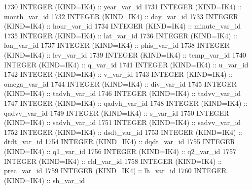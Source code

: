\begin{DoxyCode}
1730     \textcolor{keywordtype}{INTEGER (KIND=IK4)}                  :: year\_var\_id
1731     \textcolor{keywordtype}{INTEGER (KIND=IK4)}                  :: month\_var\_id
1732     \textcolor{keywordtype}{INTEGER (KIND=IK4)}                  :: day\_var\_id
1733     \textcolor{keywordtype}{INTEGER (KIND=IK4)}                  :: hour\_var\_id
1734     \textcolor{keywordtype}{INTEGER (KIND=IK4)}                  :: minute\_var\_id
1735     \textcolor{keywordtype}{INTEGER (KIND=IK4)}                  :: lat\_var\_id
1736     \textcolor{keywordtype}{INTEGER (KIND=IK4)}                  :: lon\_var\_id
1737     \textcolor{keywordtype}{INTEGER (KIND=IK4)}                  :: phis\_var\_id
1738     \textcolor{keywordtype}{INTEGER (KIND=IK4)}                  :: lev\_var\_id
1739     \textcolor{keywordtype}{INTEGER (KIND=IK4)}                  :: temp\_var\_id
1740     \textcolor{keywordtype}{INTEGER (KIND=IK4)}                  :: q\_var\_id
1741     \textcolor{keywordtype}{INTEGER (KIND=IK4)}                  :: u\_var\_id
1742     \textcolor{keywordtype}{INTEGER (KIND=IK4)}                  :: v\_var\_id
1743     \textcolor{keywordtype}{INTEGER (KIND=IK4)}                  :: omega\_var\_id
1744     \textcolor{keywordtype}{INTEGER (KIND=IK4)}                  :: div\_var\_id
1745     \textcolor{keywordtype}{INTEGER (KIND=IK4)}                  :: tadvh\_var\_id
1746     \textcolor{keywordtype}{INTEGER (KIND=IK4)}                  :: tadvv\_var\_id
1747     \textcolor{keywordtype}{INTEGER (KIND=IK4)}                  :: qadvh\_var\_id
1748     \textcolor{keywordtype}{INTEGER (KIND=IK4)}                  :: qadvv\_var\_id
1749     \textcolor{keywordtype}{INTEGER (KIND=IK4)}                  :: s\_var\_id
1750     \textcolor{keywordtype}{INTEGER (KIND=IK4)}                  :: sadvh\_var\_id
1751     \textcolor{keywordtype}{INTEGER (KIND=IK4)}                  :: sadvv\_var\_id
1752     \textcolor{keywordtype}{INTEGER (KIND=IK4)}                  :: dsdt\_var\_id
1753     \textcolor{keywordtype}{INTEGER (KIND=IK4)}                  :: dtdt\_var\_id
1754     \textcolor{keywordtype}{INTEGER (KIND=IK4)}                  :: dqdt\_var\_id
1755     \textcolor{keywordtype}{INTEGER (KIND=IK4)}                  :: q1\_var\_id
1756     \textcolor{keywordtype}{INTEGER (KIND=IK4)}                  :: q2\_var\_id
1757     \textcolor{keywordtype}{INTEGER (KIND=IK4)}                  :: cld\_var\_id
1758     \textcolor{keywordtype}{INTEGER (KIND=IK4)}                  :: prec\_var\_id
1759     \textcolor{keywordtype}{INTEGER (KIND=IK4)}                  :: lh\_var\_id
1760     \textcolor{keywordtype}{INTEGER (KIND=IK4)}                  :: sh\_var\_id

\end{DoxyCode}
